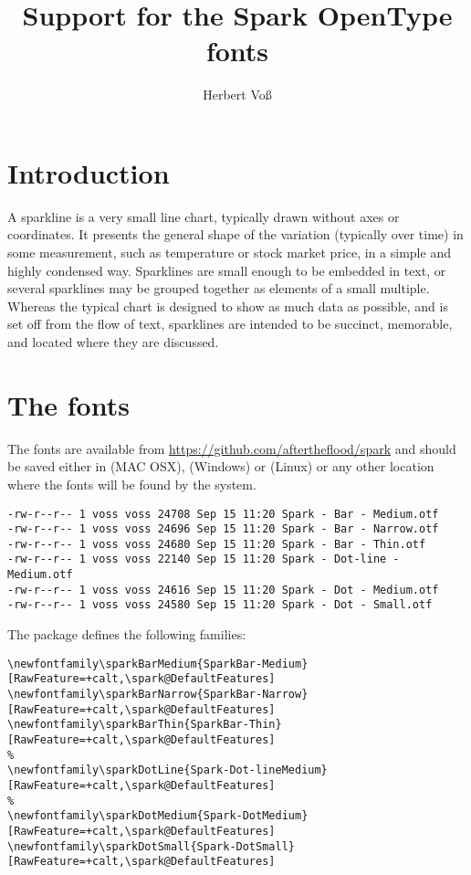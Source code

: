 \documentclass[11pt]{article}
\title{Support for the Spark OpenType fonts}
\author{Herbert Voß}
\begin{document}
\maketitle
\tableofcontents

\section{Introduction}

A sparkline is a very small line chart, typically drawn without axes or coordinates. 
It presents the general shape of the variation (typically over time) in some measurement, 
such as temperature or stock market price, in a simple and highly condensed way. 
Sparklines are small enough to be embedded in text, or several sparklines may be 
grouped together as elements of a small multiple. Whereas the typical chart is 
designed to show as much data as possible, and is set off from the flow of text, 
sparklines are intended to be succinct, memorable, and located where they are discussed.


\section{The fonts}

The fonts are available from \url{https://github.com/aftertheflood/spark} and should be saved
either in  (MAC OSX),  (Windows) or
 (Linux)  or any other location where
the fonts will be found by the system.

\begin{verbatim}
-rw-r--r-- 1 voss voss 24708 Sep 15 11:20 Spark - Bar - Medium.otf
-rw-r--r-- 1 voss voss 24696 Sep 15 11:20 Spark - Bar - Narrow.otf
-rw-r--r-- 1 voss voss 24680 Sep 15 11:20 Spark - Bar - Thin.otf
-rw-r--r-- 1 voss voss 22140 Sep 15 11:20 Spark - Dot-line - Medium.otf
-rw-r--r-- 1 voss voss 24616 Sep 15 11:20 Spark - Dot - Medium.otf
-rw-r--r-- 1 voss voss 24580 Sep 15 11:20 Spark - Dot - Small.otf
\end{verbatim}


The package defines the following families:

\small
\begin{verbatim}
\newfontfamily\sparkBarMedium{SparkBar-Medium}[RawFeature=+calt,\spark@DefaultFeatures]
\newfontfamily\sparkBarNarrow{SparkBar-Narrow}[RawFeature=+calt,\spark@DefaultFeatures]
\newfontfamily\sparkBarThin{SparkBar-Thin}[RawFeature=+calt,\spark@DefaultFeatures]
%
\newfontfamily\sparkDotLine{Spark-Dot-lineMedium}[RawFeature=+calt,\spark@DefaultFeatures]
%
\newfontfamily\sparkDotMedium{Spark-DotMedium}[RawFeature=+calt,\spark@DefaultFeatures]
\newfontfamily\sparkDotSmall{Spark-DotSmall}[RawFeature=+calt,\spark@DefaultFeatures]
\end{verbatim}
\end{document}
